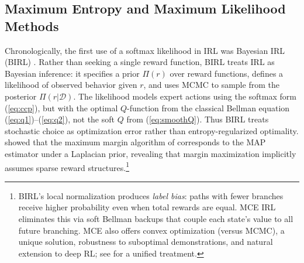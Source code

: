 \subsection{Maximum Entropy and Maximum Likelihood Methods}

Chronologically, the first use of a softmax likelihood in IRL was Bayesian IRL (BIRL) \citep{birl:2007}. Rather than seeking a single reward function, BIRL treats IRL as Bayesian inference: it specifies a prior $\Pi(r)$ over reward functions, defines a likelihood of observed behavior given $r$, and uses MCMC to sample from the posterior $\Pi(r|\mathcal{D})$. The likelihood models expert actions using the softmax form (\ref{eq:ccp}), but with the optimal $Q$-function from the classical Bellman equation (\ref{eq:q1})--(\ref{eq:q2}), not the soft $Q$ from (\ref{eq:smoothQ}). Thus BIRL treats stochastic choice as optimization error rather than entropy-regularized optimality. \citet{birl:2007} showed that the maximum margin algorithm of \citet{ng:2000} corresponds to the MAP estimator under a Laplacian prior, revealing that margin maximization implicitly assumes sparse reward structures.\footnote{\footnotesize BIRL's local normalization produces {\it label bias\/}: paths with fewer branches receive higher probability even when total rewards are equal. MCE IRL eliminates this via soft Bellman backups that couple each state's value to all future branching. MCE also offers convex optimization (versus MCMC), a unique solution, robustness to suboptimal demonstrations, and natural extension to deep RL; see \citet{ni:2022} for a unified treatment.}

